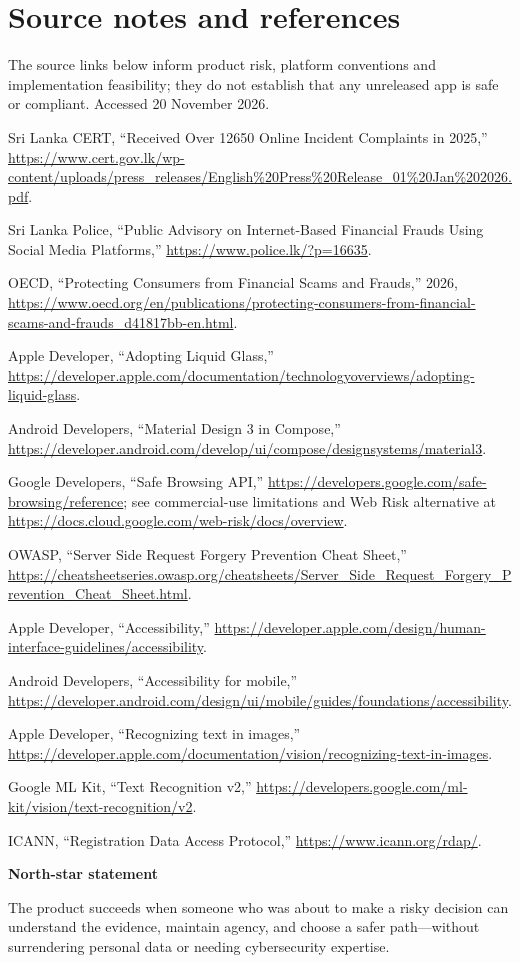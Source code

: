 \documentclass[10pt,a4paper]{article}
\begin{document}
\section{Source notes and references}
\small
The source links below inform product risk, platform conventions and implementation feasibility; they do not establish that any unreleased app is safe or compliant. Accessed 20 November 2026.
\begin{enumerate}[label={[\arabic*]},leftmargin=15mm]
\item Sri Lanka CERT, ``Received Over 12650 Online Incident Complaints in 2025,'' \url{https://www.cert.gov.lk/wp-content/uploads/press_releases/English%20Press%20Release_01%20Jan%202026.pdf}.
\item Sri Lanka Police, ``Public Advisory on Internet-Based Financial Frauds Using Social Media Platforms,'' \url{https://www.police.lk/?p=16635}.
\item OECD, ``Protecting Consumers from Financial Scams and Frauds,'' 2026, \url{https://www.oecd.org/en/publications/protecting-consumers-from-financial-scams-and-frauds_d41817bb-en.html}.
\item Apple Developer, ``Adopting Liquid Glass,'' \url{https://developer.apple.com/documentation/technologyoverviews/adopting-liquid-glass}.
\item Android Developers, ``Material Design 3 in Compose,'' \url{https://developer.android.com/develop/ui/compose/designsystems/material3}.
\item Google Developers, ``Safe Browsing API,'' \url{https://developers.google.com/safe-browsing/reference}; see commercial-use limitations and Web Risk alternative at \url{https://docs.cloud.google.com/web-risk/docs/overview}.
\item OWASP, ``Server Side Request Forgery Prevention Cheat Sheet,'' \url{https://cheatsheetseries.owasp.org/cheatsheets/Server_Side_Request_Forgery_Prevention_Cheat_Sheet.html}.
\item Apple Developer, ``Accessibility,'' \url{https://developer.apple.com/design/human-interface-guidelines/accessibility}.
\item Android Developers, ``Accessibility for mobile,'' \url{https://developer.android.com/design/ui/mobile/guides/foundations/accessibility}.
\item Apple Developer, ``Recognizing text in images,'' \url{https://developer.apple.com/documentation/vision/recognizing-text-in-images}.
\item Google ML Kit, ``Text Recognition v2,'' \url{https://developers.google.com/ml-kit/vision/text-recognition/v2}.
\item ICANN, ``Registration Data Access Protocol,'' \url{https://www.icann.org/rdap/}.
\end{enumerate}
\normalsize
\vfill
\begin{greenbox}
\textbf{North-star statement}\par
The product succeeds when someone who was about to make a risky decision can understand the evidence, maintain agency, and choose a safer path---without surrendering personal data or needing cybersecurity expertise.
\end{greenbox}
\end{document}
